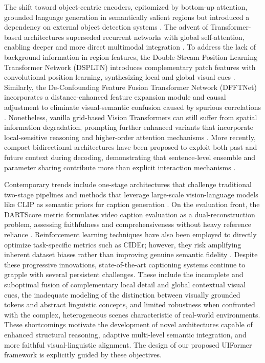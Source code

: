 \documentclass[lettersize,journal]{IEEEtran}
\begin{document}
	The shift toward object-centric encoders, epitomized by bottom-up attention, grounded language generation in semantically salient regions but introduced a dependency on external object detection systems \cite{anderson2018bottom, 8630068, 9279262}. The advent of Transformer-based architectures superseded recurrent networks with global self-attention, enabling deeper and more direct multimodal integration \cite{vaswani2017attention, cornia2020meshed}. To address the lack of background information in region features, the Double-Stream Position Learning Transformer Network (DSPLTN) introduces complementary patch features with convolutional position learning, synthesizing local and global visual cues \cite{jiang2022doublestream}. Similarly, the De-Confounding Feature Fusion Transformer Network (DFFTNet) incorporates a distance-enhanced feature expansion module and causal adjustment to eliminate visual-semantic confusion caused by spurious correlations \cite{cao2025deconfounding}. Nonetheless, vanilla grid-based Vision Transformers can still suffer from spatial information degradation, prompting further enhanced variants that incorporate local-sensitive reasoning and higher-order attention mechanisms \cite{ma2023towards, zeng2022s2, luo2021dual, pan2020x, wang2023cropcap}. More recently, compact bidirectional architectures have been proposed to exploit both past and future context during decoding, demonstrating that sentence-level ensemble and parameter sharing contribute more than explicit interaction mechanisms \cite{11474636}.
	
	Contemporary trends include one-stage architectures that challenge traditional two-stage pipelines and methods that leverage large-scale vision-language models like CLIP as semantic priors for caption generation \cite{wang2022osic, 10659916}. On the evaluation front, the DARTScore metric formulates video caption evaluation as a dual-reconstruction problem, assessing faithfulness and comprehensiveness without heavy reference reliance \cite{chen2024dartscore}. Reinforcement learning techniques have also been employed to directly optimize task-specific metrics such as CIDEr; however, they risk amplifying inherent dataset biases rather than improving genuine semantic fidelity \cite{rennie2017self}. Despite these progressive innovations, state-of-the-art captioning systems continue to grapple with several persistent challenges. These include the incomplete and suboptimal fusion of complementary local detail and global contextual visual cues, the inadequate modeling of the distinction between visually grounded tokens and abstract linguistic concepts, and limited robustness when confronted with the complex, heterogeneous scenes characteristic of real-world environments. These shortcomings motivate the development of novel architectures capable of enhanced structural reasoning, adaptive multi-level semantic integration, and more faithful visual-linguistic alignment. The design of our proposed UIFormer framework is explicitly guided by these objectives.
	
\end{document}

